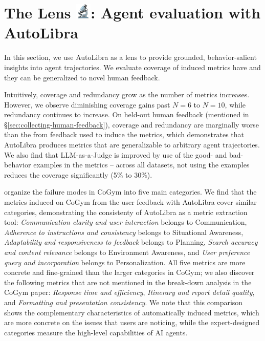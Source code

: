 \section{The Lens \protect\includegraphics[height=1em]{figs/microscope.png}: Agent evaluation with AutoLibra}
\label{sec:lens}

In this section, we use AutoLibra as a lens to provide grounded, behavior-salient insights into agent trajectories. We evaluate coverage of induced metrics have and they can be generalized to novel human feedback.

Intuitively, coverage and redundancy grow as the number of metrics increases. However, we observe diminishing coverage gains past $N=6$ to $N=10$, while redundancy continues to increase.
On held-out human feedback (mentioned in \S\ref{sec:collecting-human-feedback}), coverage and redundancy are marginally worse than the from feedback used to induce the metrics, which demonstrates that AutoLibra produces metrics that are generalizable to arbitrary agent trajectories. We also find  that LLM-as-a-Judge is improved by use of the good- and bad-behavior examples in the metrics -- across all datasets, not using the examples reduces the coverage significantly (5\% to 30\%). 



\citet{shao2024collaborative} organize the failure modes in CoGym into five main categories. We find that the metrics induced on CoGym from the user feedback with AutoLibra cover similar categories, demonstrating the consistenty of AutoLibra as a metric extraction tool: \textit{Communication clarity and user interaction} belongs to Communication,  \textit{Adherence to instructions and consistency} belongs to Situational Awareness, \textit{Adaptability and responsiveness to feedback} belongs to Planning, \textit{Search accuracy and content relevance} belongs to Environment Awareness, and \textit{User preference query and incorporation} belongs to Personalization. All five metrics are more concrete and fine-grained than the larger categories in CoGym; we also discover the following metrics that are not mentioned in the break-down analysis in the CoGym paper:
\textit{Response time and efficiency}, \textit{Itinerary and report detail quality}, and \textit{Formatting and presentation consistency}. We note that this comparison shows the complementary characteristics of automatically 
induced metrics, which are more concrete on the issues that users are noticing, while the expert-designed categories measure the high-level capabilities of AI agents. 

